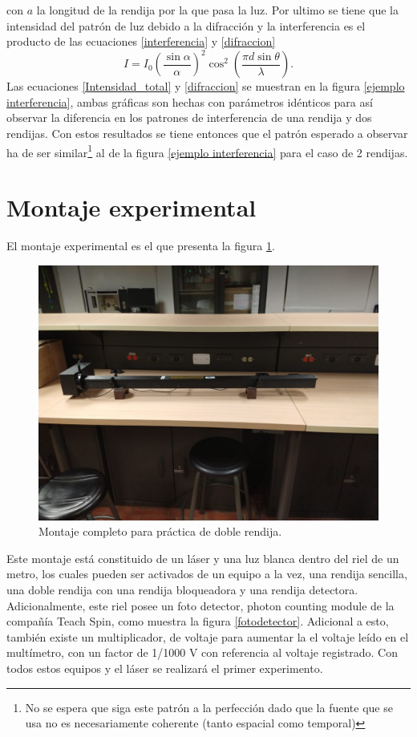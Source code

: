 \documentclass[%
 reprint,
 amsmath,amssymb,
 aps,
]{revtex4-1}
\begin{document}
con $a$ la longitud de la rendija por la que pasa la luz. Por ultimo se tiene que la intensidad del patrón de luz debido a la difracción y la interferencia es el producto de las ecuaciones \eqref{interferencia} y \eqref{difraccion}
\begin{equation}
I=I_0\left(\frac{\sin\alpha}{\alpha}\right)^2\cos^2\left(\frac{\pi d \sin\theta}{\lambda}\right).
\label{Intensidad_total}
\end{equation}
Las ecuaciones \eqref{Intensidad_total} y \eqref{difraccion} se muestran en la figura \ref{ejemplo interferencia}, ambas gráficas son hechas con parámetros idénticos para así observar la diferencia en los patrones de interferencia de una rendija y dos rendijas. Con estos resultados se tiene entonces que el patrón esperado a observar ha de ser similar\footnote{No se espera que siga este patrón a la perfección dado que la fuente que se usa no es necesariamente coherente (tanto espacial como temporal)} al de la figura \ref{ejemplo interferencia} para el caso de 2 rendijas. 
\section{Montaje experimental}

El montaje experimental es el que presenta la figura \ref{montajecompleto}.

\begin{figure}[h]
    \centering
    \includegraphics[scale=0.1]{Double_Slit/Figuras/MontajeCompleto.jpg}
    \caption{Montaje completo para práctica de doble rendija.}
    \label{montajecompleto}
\end{figure}
 Este montaje está constituido de un láser y una luz blanca dentro del riel de un metro, los cuales pueden ser activados de un equipo a la vez, una rendija sencilla, una doble rendija con una rendija bloqueadora y una rendija detectora. Adicionalmente, este riel posee un foto detector, photon counting module de la compañía Teach Spin, como muestra la figura \ref{fotodetector}. Adicional a esto, también existe un multiplicador, de voltaje para aumentar la el voltaje leído en el multímetro, con un factor de 1/1000 V con referencia al voltaje registrado. Con todos estos equipos y el láser se realizará el primer experimento.
 
\end{document}

